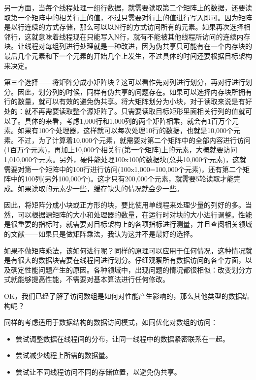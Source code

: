 另一方面，当每个线程处理一组行数据，就需要读取第二个矩阵上的数据，还要读取第一个矩阵中的相关行上的值，不过只需要对行上的值进行写入即可。因为矩阵是以行连续的方式存储，那么可以以N行的方式访问所有的元素。如果再次选择相邻行，这就意味着线程现在只能写入N行，就有不能被其他线程所访问的连续内存块。让线程对每组列进行处理就是一种改进，因为伪共享只可能有在一个内存块的最后几个元素和下一个元素的开始几个上发生，不过具体的时间还要根据目标架构来决定。

第三个选择——将矩阵分成小矩阵块？这可以看作先对列进行划分，再对行进行划分。因此，划分列的时候，同样有伪共享的问题存在。如果可以选择内存块所拥有行的数量，就可以有效的避免伪共享。将大矩阵划分为小块，对于读取来说是有好处的：就不再需要读取整个源矩阵了。只需要读取目标矩形里面相关行列的值就可以了。具体的来看，考虑1,000行和1,000列的两个矩阵相乘，就会有1百万个元素。如果有100个处理器，这样就可以每次处理10行的数据，也就是10,000个元素。不过，为了计算着10,000个元素，就需要对第二个矩阵中的全部内容进行访问(1百万个元素)，再加上10,000个相关行(第一个矩阵)上的元素，大概就要访问1,010,000个元素。另外，硬件能处理100x100的数据块(总共10,000个元素)，这就需要对第一个矩阵中的100行进行访问(100x1,000=100,000个元素)，还有第二个矩阵中的100列(另外100,000个)。这才只有200,000个元素，就需要5轮读取才能完成。如果读取的元素少一些，缓存缺失的情况就会少一些。

因此，将矩阵分成小块或正方形的块，要比使用单线程来处理少量的列好的多。当然，可以根据源矩阵的大小和处理器的数量，在运行时对块的大小进行调整。性能是很重要的指标时，就需要对目标架构上的各项指标进行测量，并且查阅相关领域的文献——如果只是做矩阵乘法，我认为这并不是最好的选择。

如果不做矩阵乘法，该如何进行呢？同样的原理可以应用于任何情况，这种情况就是有很大的数据块需要在线程间进行划分。仔细观察所有数据访问的各个方面，以及确定性能问题产生的原因。各种领域中，出现问题的情况都很相似：改变划分方式就能够提高性能，不需要对基本算法进行任何修改。

OK，我们已经了解了访问数组是如何对性能产生影响的，那么其他类型的数据结构呢？


同样的考虑适用于数据结构的数据访问模式，如同优化对数组的访问：

\begin{itemize}
    \item 尝试调整数据在线程间的分布，让同一线程中的数据紧密联系在一起。
    \item 尝试减少线程上所需的数据量。
    \item 尝试让不同线程访问不同的存储位置，以避免伪共享。
\end{itemize}

